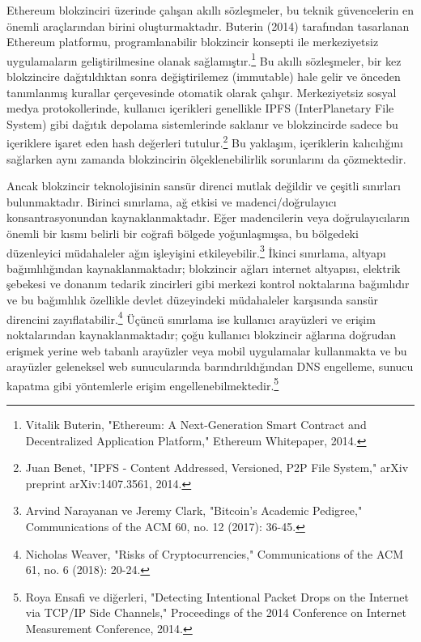 \documentclass[11pt,a4paper]{article}
\begin{document}
Ethereum blokzinciri üzerinde çalışan akıllı sözleşmeler, bu teknik güvencelerin en önemli araçlarından birini oluşturmaktadır. Buterin (2014) tarafından tasarlanan Ethereum platformu, programlanabilir blokzincir konsepti ile merkeziyetsiz uygulamaların geliştirilmesine olanak sağlamıştır.\footnote{Vitalik Buterin, "Ethereum: A Next-Generation Smart Contract and Decentralized Application Platform," Ethereum Whitepaper, 2014.} Bu akıllı sözleşmeler, bir kez blokzincire dağıtıldıktan sonra değiştirilemez (immutable) hale gelir ve önceden tanımlanmış kurallar çerçevesinde otomatik olarak çalışır. Merkeziyetsiz sosyal medya protokollerinde, kullanıcı içerikleri genellikle IPFS (InterPlanetary File System) gibi dağıtık depolama sistemlerinde saklanır ve blokzincirde sadece bu içeriklere işaret eden hash değerleri tutulur.\footnote{Juan Benet, "IPFS - Content Addressed, Versioned, P2P File System," arXiv preprint arXiv:1407.3561, 2014.} Bu yaklaşım, içeriklerin kalıcılığını sağlarken aynı zamanda blokzincirin ölçeklenebilirlik sorunlarını da çözmektedir.

Ancak blokzincir teknolojisinin sansür direnci mutlak değildir ve çeşitli sınırları bulunmaktadır. Birinci sınırlama, ağ etkisi ve madenci/doğrulayıcı konsantrasyonundan kaynaklanmaktadır. Eğer madencilerin veya doğrulayıcıların önemli bir kısmı belirli bir coğrafi bölgede yoğunlaşmışsa, bu bölgedeki düzenleyici müdahaleler ağın işleyişini etkileyebilir.\footnote{Arvind Narayanan ve Jeremy Clark, "Bitcoin's Academic Pedigree," Communications of the ACM 60, no. 12 (2017): 36-45.} İkinci sınırlama, altyapı bağımlılığından kaynaklanmaktadır; blokzincir ağları internet altyapısı, elektrik şebekesi ve donanım tedarik zincirleri gibi merkezi kontrol noktalarına bağımlıdır ve bu bağımlılık özellikle devlet düzeyindeki müdahaleler karşısında sansür direncini zayıflatabilir.\footnote{Nicholas Weaver, "Risks of Cryptocurrencies," Communications of the ACM 61, no. 6 (2018): 20-24.} Üçüncü sınırlama ise kullanıcı arayüzleri ve erişim noktalarından kaynaklanmaktadır; çoğu kullanıcı blokzincir ağlarına doğrudan erişmek yerine web tabanlı arayüzler veya mobil uygulamalar kullanmakta ve bu arayüzler geleneksel web sunucularında barındırıldığından DNS engelleme, sunucu kapatma gibi yöntemlerle erişim engellenebilmektedir.\footnote{Roya Ensafi ve diğerleri, "Detecting Intentional Packet Drops on the Internet via TCP/IP Side Channels," Proceedings of the 2014 Conference on Internet Measurement Conference, 2014.}
\end{document}
